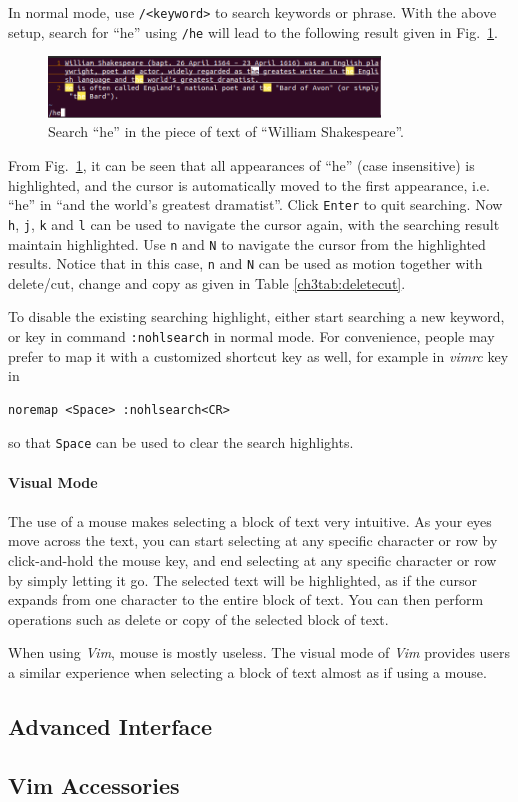 In normal mode, use \verb|/<keyword>| to search keywords or phrase. With the above setup, search for ``he'' using \verb|/he| will lead to the following result given in Fig.~\ref{ch3fig:vimdemo2}.
\begin{figure}
\centering
\includegraphics[width=250pt]{chapters/chapter3/figures/vimdemo2.png}
\caption{Search ``he'' in the piece of text of ``William Shakespeare''.} \label{ch3fig:vimdemo2}
\end{figure}
From Fig.~\ref{ch3fig:vimdemo2}, it can be seen that all appearances of ``he'' (case insensitive) is highlighted, and the cursor is automatically moved to the first appearance, i.e. ``he'' in ``and the world's greatest dramatist''. Click \verb|Enter| to quit searching. Now \verb|h|, \verb|j|, \verb|k| and \verb|l| can be used to navigate the cursor again, with the searching result maintain highlighted. Use \verb|n| and \verb|N| to navigate the cursor from the highlighted results. Notice that in this case, \verb|n| and \verb|N| can be used as motion together with delete/cut, change and copy as given in Table \ref{ch3tab:deletecut}.

To disable the existing searching highlight, either start searching a new keyword, or key in command \verb|:nohlsearch| in normal mode. For convenience, people may prefer to map it with a customized shortcut key as well, for example in \textit{vimrc} key in
\begin{verbatim}
noremap <Space> :nohlsearch<CR>
\end{verbatim}
so that \verb|Space| can be used to clear the search highlights. 
\\
\\
\noindent \textbf{Visual Mode}
\\
\\
The use of a mouse makes selecting a block of text very intuitive. As your eyes move across the text, you can start selecting at any specific character or row by click-and-hold the mouse key, and end selecting at any specific character or row by simply letting it go. The selected text will be highlighted, as if the cursor expands from one character to the entire block of text. You can then perform operations such as delete or copy of the selected block of text.

When using \textit{Vim}, mouse is mostly useless. The visual mode of \textit{Vim} provides users a similar experience when selecting a block of text almost as if using a mouse. 




\subsection{Advanced Interface}


\subsection{Vim Accessories}



